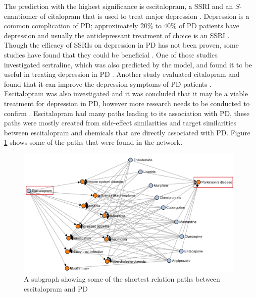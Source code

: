 The prediction with the highest significance is escitalopram, a \ac{SSRI} and an $S$-enantiomer of citalopram that is used to treat major depression \cite{weintraub_escitalopram_2006}. Depression is a common complication of \ac{PD}; approximately 20\% to 40\% of \ac{PD} patients have depression and usually the antidepressant treatment of choice is an \ac{SSRI} \cite{weintraub_escitalopram_2006}. Though the efficacy of \ac{SSRI}s on depression in \ac{PD} has not been proven, some studies have found that they could be beneficial \cite{rampello_ssri_2002, hauser_sertraline_1997, ceravolo_paroxetine_2000, menza_citalopram_2004}. One of those studies investigated sertraline, which was also predicted by the model, and found it to be useful in treating depression in \ac{PD} \cite{hauser_sertraline_1997}. Another study evaluated citalopram and found that it can improve the depression symptoms of PD patients \cite{menza_citalopram_2004}. Escitalopram was also investigated and it was concluded that it may be a viable treatment for depression in PD, however more research needs to be conducted to confirm \cite{weintraub_escitalopram_2006, verma_efficacy_2012}. Escitalopram had many paths leading to its association with \ac{PD}, these paths were mostly created from side-effect similarities and target similarities between escitalopram and chemicals that are directly associated with \ac{PD}. Figure \ref{fig:parkinson_escitalopram} shows some of the paths that were found in the network.

\begin{figure}[h!]
    \centering
    \includegraphics[scale=0.6]
    {figures/parkinson_escitalopram.jpg}
    \caption [Escitalopram-PD path subgraph]{\label{fig:parkinson_escitalopram} A subgraph showing some of the shortest relation paths between escitalopram and \ac{PD}}
\end{figure}

